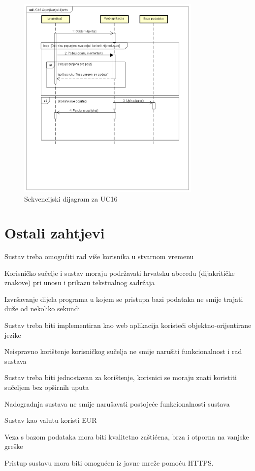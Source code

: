 				\begin{figure}[H]
					\centering
					\includegraphics[width=0.8\textwidth]{slike/UC16_Ocjenjivanje_klijenta.png}
					\caption{Sekvencijski dijagram za UC16}
					\label{fig:your_label}
				\end{figure}
	
		\section{Ostali zahtjevi}
		
			\begin{packed_item} 
				\item Sustav treba omogućiti rad više korisnika u stvarnom vremenu
				\item Korisničko sučelje i sustav moraju podržavati hrvatsku abecedu (dijakritičke znakove) pri unosu i prikazu tekstualnog sadržaja
				\item Izvršavanje dijela programa u kojem se pristupa bazi podataka ne smije trajati duže od nekoliko sekundi 
				\item Sustav treba biti implementiran kao web aplikacija koristeći objektno-orijentirane jezike
				\item Neispravno korištenje korisničkog sučelja ne smije narušiti funkcionalnost i rad sustava
				\item
				Sustav treba biti jednostavan za korištenje, korisnici se moraju znati koristiti sučeljem bez opširnih uputa
				\item 
				Nadogradnja sustava ne smije narušavati postojeće funkcionalnosti sustava
				\item 
				Sustav kao valutu koristi EUR
				\item 
				Veza s bazom podataka mora biti kvalitetno zaštićena, brza i otporna na vanjske greške
				\item 
				Pristup sustavu mora biti omogućen iz javne mreže pomoću HTTPS.
			\end{packed_item}
			 
			 
			 
	